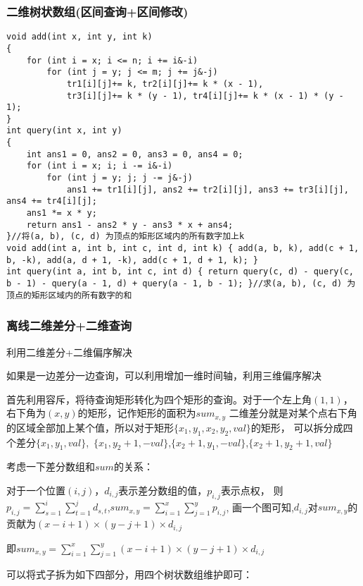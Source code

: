 \documentclass[a4paper,fontset=none]{ctexart}
\begin{document}
\subsubsection{二维树状数组(区间查询+区间修改)}

\begin{verbatim}
void add(int x, int y, int k)
{
    for (int i = x; i <= n; i += i&-i)
        for (int j = y; j <= m; j += j&-j)
            tr1[i][j]+= k, tr2[i][j]+= k * (x - 1),
            tr3[i][j]+= k * (y - 1), tr4[i][j]+= k * (x - 1) * (y - 1);
}
int query(int x, int y)
{
    int ans1 = 0, ans2 = 0, ans3 = 0, ans4 = 0;
    for (int i = x; i; i -= i&-i)
        for (int j = y; j; j -= j&-j)
            ans1 += tr1[i][j], ans2 += tr2[i][j], ans3 += tr3[i][j], ans4 += tr4[i][j];
    ans1 *= x * y;
    return ans1 - ans2 * y - ans3 * x + ans4;
}//将(a, b), (c, d) 为顶点的矩形区域内的所有数字加上k
void add(int a, int b, int c, int d, int k) { add(a, b, k), add(c + 1, b, -k), add(a, d + 1, -k), add(c + 1, d + 1, k); }
int query(int a, int b, int c, int d) { return query(c, d) - query(c, b - 1) - query(a - 1, d) + query(a - 1, b - 1); }//求(a, b), (c, d) 为顶点的矩形区域内的所有数字的和

\end{verbatim}
\subsubsection{离线二维差分+二维查询}

利用二维差分+二维偏序解决

如果是一边差分一边查询，可以利用增加一维时间轴，利用三维偏序解决

首先利用容斥，将待查询矩形转化为四个矩形的查询。对于一个左上角$(1,1)$，右下角为$(x,y)$的矩形，记作矩形的面积为$sum_{x,y}$
二维差分就是对某个点右下角的区域全部加上某个值，所以对于矩形$\{x_1,y_1,x_2,y_2,val\}$的矩形，
可以拆分成四个差分$\{x_1,y_1,val\}$,\ $\{x_1,y_2+1,-val\}$,$\{x_2+1,y_1,-val\}$,$\{x_2+1,y_2+1,val\}$

考虑一下差分数组和$sum$的关系：

对于一个位置$(i,j)$，$d_{i,j}$表示差分数组的值，$p_{i,j}$表示点权，
则$p_{i,j}=\sum_{s=1}^i\sum_{t=1}^jd_{s,t}$,$sum_{x,y}=\sum_{i=1}^x\sum_{j=1}^yp_{i,j}$,
画一个图可知,$d_{i,j}$对$sum_{x,y}$的贡献为$(x-i+1)\times(y-j+1)\times d_{i,j}$

即$sum_{x,y}=\sum_{i=1}^x\sum_{j=1}^y(x-i+1)\times (y-j+1)\times d_{i,j}$

可以将式子拆为如下四部分，用四个树状数组维护即可：
\end{document}
